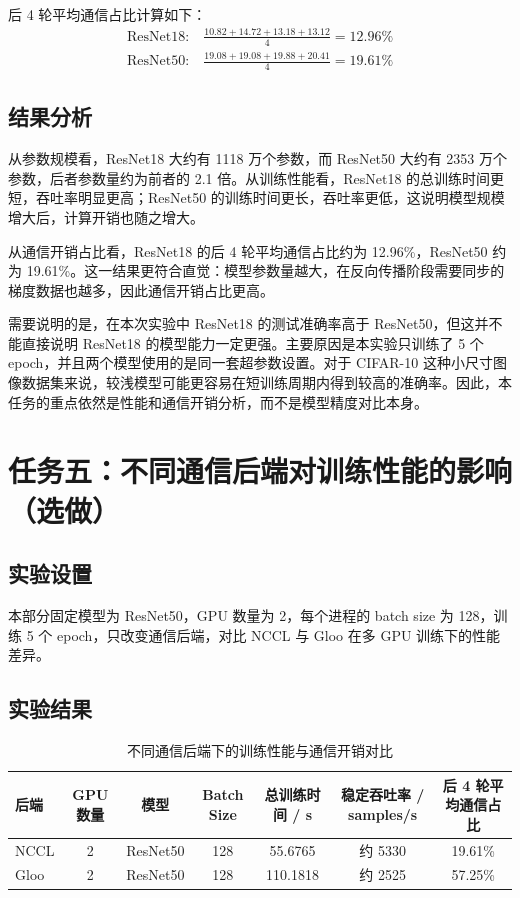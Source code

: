 \documentclass{article}
\begin{document}
后 4 轮平均通信占比计算如下：
\begin{align*}
  \text{ResNet18}:&\ \frac{10.82 + 14.72 + 13.18 + 13.12}{4} = 12.96\% \\
  \text{ResNet50}:&\ \frac{19.08 + 19.08 + 19.88 + 20.41}{4} = 19.61\%
\end{align*}

\subsection{结果分析}
从参数规模看，ResNet18 大约有 1118 万个参数，而 ResNet50 大约有 2353 万个参数，后者参数量约为前者的 2.1 倍。从训练性能看，ResNet18 的总训练时间更短，吞吐率明显更高；ResNet50 的训练时间更长，吞吐率更低，这说明模型规模增大后，计算开销也随之增大。

从通信开销占比看，ResNet18 的后 4 轮平均通信占比约为 12.96\%，ResNet50 约为 19.61\%。这一结果更符合直觉：模型参数量越大，在反向传播阶段需要同步的梯度数据也越多，因此通信开销占比更高。

需要说明的是，在本次实验中 ResNet18 的测试准确率高于 ResNet50，但这并不能直接说明 ResNet18 的模型能力一定更强。主要原因是本实验只训练了 5 个 epoch，并且两个模型使用的是同一套超参数设置。对于 CIFAR-10 这种小尺寸图像数据集来说，较浅模型可能更容易在短训练周期内得到较高的准确率。因此，本任务的重点依然是性能和通信开销分析，而不是模型精度对比本身。

\section{任务五：不同通信后端对训练性能的影响（选做）}
\subsection{实验设置}
本部分固定模型为 ResNet50，GPU 数量为 2，每个进程的 batch size 为 128，训练 5 个 epoch，只改变通信后端，对比 NCCL 与 Gloo 在多 GPU 训练下的性能差异。

\subsection{实验结果}
\begin{table}[H]
  \centering
  \caption{不同通信后端下的训练性能与通信开销对比}
  \label{tab:backend_result}
  \begin{tabular}{lcccccc}
    \toprule
    后端 & GPU 数量 & 模型 & Batch Size & 总训练时间 / s & 稳定吞吐率 / samples/s & 后 4 轮平均通信占比 \\
    \midrule
    NCCL & 2 & ResNet50 & 128 & 55.6765 & 约 5330 & 19.61\% \\
    Gloo & 2 & ResNet50 & 128 & 110.1818 & 约 2525 & 57.25\% \\
    \bottomrule
  \end{tabular}
\end{table}
\end{document}
